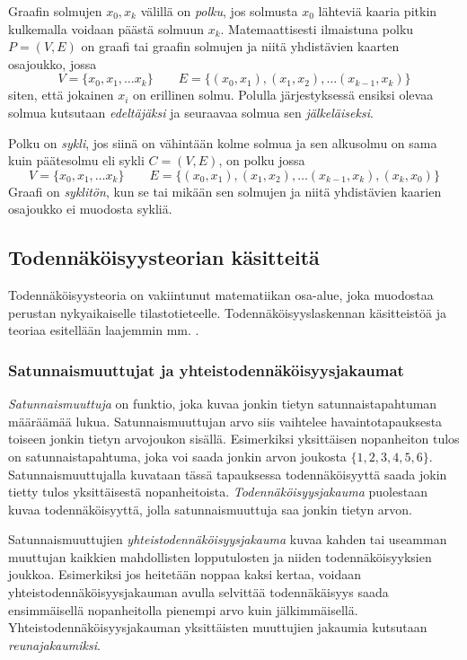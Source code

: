 Graafin solmujen $x_0, x_k$ välillä on \emph{polku}, jos solmusta $x_0$ lähteviä kaaria pitkin kulkemalla voidaan päästä solmuun $x_k$. Matemaattisesti ilmaistuna polku $P=(V,E)$ on graafi tai graafin solmujen ja niitä yhdistävien kaarten osajoukko, jossa 
$$
    V = \{x_0, x_1, \ldots x_k \} \qquad E = \{(x_0, x_1), (x_1,x_2),\ldots(x_{k-1}, x_k)\}
$$ 
siten, että jokainen $x_i$ on erillinen solmu. Polulla järjestyksessä ensiksi olevaa solmua kutsutaan \emph{edeltäjäksi} ja seuraavaa solmua sen \emph{jälkeläiseksi}.

Polku on \emph{sykli}, jos siinä on vähintään kolme solmua ja sen alkusolmu on sama kuin päätesolmu eli sykli $C = (V, E)$, on polku jossa
$$
    V = \{x_0, x_1, \ldots x_k \} \qquad E = \{(x_0, x_1), (x_1,x_2),\ldots(x_{k-1}, x_k), (x_k, x_0)\}
$$
Graafi on \emph{syklitön}, kun se tai mikään sen solmujen ja niitä yhdistävien kaarien osajoukko ei muodosta sykliä. 

\subsection{Todennäköisyysteorian käsitteitä}
Todennäköisyysteoria on vakiintunut matematiikan osa-alue, joka muodostaa perustan nykyaikaiselle tilastotieteelle. Todennäköisyyslaskennan käsitteistöä ja teoriaa esitellään laajemmin mm. \citet{dasgupta_probability_2011}.

\subsubsection{Satunnaismuuttujat ja yhteistodennäköisyysjakaumat}
\emph{Satunnaismuuttuja} on funktio, joka kuvaa jonkin tietyn satunnaistapahtuman määräämää lukua. Satunnaismuuttujan arvo siis vaihtelee havaintotapauksesta toiseen jonkin tietyn arvojoukon sisällä. Esimerkiksi yksittäisen nopanheiton tulos on satunnaistapahtuma, joka voi saada jonkin arvon joukosta $\{1,2,3,4,5,6\}$. Satunnaismuuttujalla kuvataan tässä tapauksessa todennäköisyyttä saada jokin tietty tulos yksittäisestä nopanheitoista. \emph{Todennäköisyysjakauma} puolestaan kuvaa todennäköisyyttä, jolla satunnaismuuttuja saa jonkin tietyn arvon.

Satunnaismuuttujien \emph{yhteistodennäköisyysjakauma} kuvaa kahden tai useamman muuttujan kaikkien mahdollisten lopputulosten ja niiden todennäköisyyksien joukkoa. Esimerkiksi jos heitetään noppaa kaksi kertaa, voidaan yhteistodennäköisyysjakauman avulla selvittää todennäkäisyys saada ensimmäisellä nopanheitolla pienempi arvo kuin jälkimmäisellä. Yhteistodennäköisyysjakauman yksittäisten muuttujien jakaumia kutsutaan \emph{reunajakaumiksi}.

